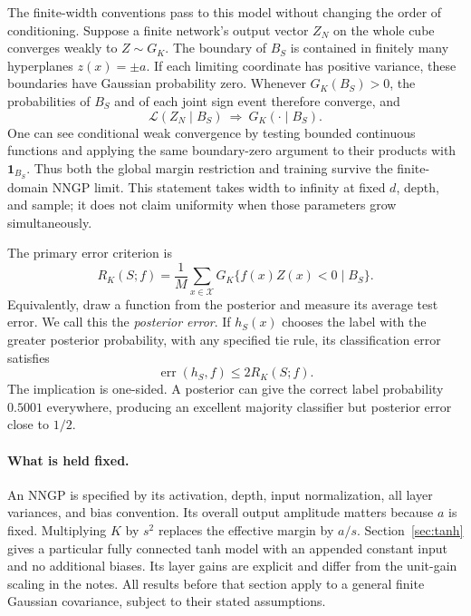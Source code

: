 \documentclass[11pt]{article}
\theoremstyle{remark}\newtheorem{remark}[theorem]{Remark}
\newcommand{\X}{\mathcal X}
\begin{document}
The finite-width conventions pass to this model without changing the order of conditioning. Suppose a finite network's output vector $Z_N$ on the whole cube converges weakly to $Z\sim G_K$. The boundary of $B_S$ is contained in finitely many hyperplanes $z(x)=\pm a$. If each limiting coordinate has positive variance, these boundaries have Gaussian probability zero. Whenever $G_K(B_S)>0$, the probabilities of $B_S$ and of each joint sign event therefore converge, and
\[
 \mathcal L(Z_N\mid B_S)\ \Longrightarrow\ G_K(\cdot\mid B_S).
\]
One can see conditional weak convergence by testing bounded continuous functions and applying the same boundary-zero argument to their products with $\mathbf1_{B_S}$. Thus both the global margin restriction and training survive the finite-domain NNGP limit. This statement takes width to infinity at fixed $d$, depth, and sample; it does not claim uniformity when those parameters grow simultaneously.

The primary error criterion is
\begin{equation}\label{eq:risks}
 R_K(S;f)=\frac1M\sum_{x\in\X}G_K\{f(x)Z(x)<0\mid B_S\}.
\end{equation}
Equivalently, draw a function from the posterior and measure its average test error. We call this the \emph{posterior error}. If $h_S(x)$ chooses the label with the greater posterior probability, with any specified tie rule, its classification error satisfies
\begin{equation}\label{eq:majority}
 \operatorname{err}(h_S,f)\le 2R_K(S;f).
\end{equation}
The implication is one-sided. A posterior can give the correct label probability $0.5001$ everywhere, producing an excellent majority classifier but posterior error close to $1/2$.

\paragraph{What is held fixed.}
An NNGP is specified by its activation, depth, input normalization, all layer variances, and bias convention. Its overall output amplitude matters because $a$ is fixed. Multiplying $K$ by $s^2$ replaces the effective margin by $a/s$. Section~\ref{sec:tanh} gives a particular fully connected tanh model with an appended constant input and no additional biases. Its layer gains are explicit and differ from the unit-gain scaling in the notes. All results before that section apply to a general finite Gaussian covariance, subject to their stated assumptions.
\end{document}
